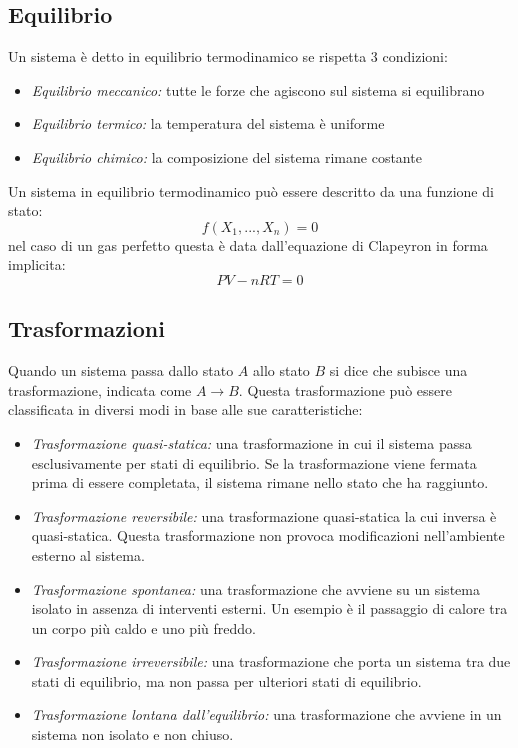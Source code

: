 \documentclass{article}
\begin{document}
\subsection{Equilibrio}
Un sistema è detto in equilibrio termodinamico se rispetta 3 condizioni:
\begin{itemize}
    \item \textit{Equilibrio meccanico:} tutte le forze che agiscono sul sistema si equilibrano
    \item \textit{Equilibrio termico:} la temperatura del sistema è uniforme
    \item \textit{Equilibrio chimico:} la composizione del sistema rimane costante
\end{itemize}
Un sistema in equilibrio termodinamico può essere descritto da una funzione di stato:
$$ f(X_1,...,X_n) = 0 $$
nel caso di un gas perfetto questa è data dall'equazione di Clapeyron in forma implicita:
$$ PV-nRT=0 $$


\subsection{Trasformazioni}
Quando un sistema passa dallo stato $A$ allo stato $B$ si dice che subisce una trasformazione, indicata come $A\rightarrow B$. Questa trasformazione può essere classificata in diversi modi in base alle sue caratteristiche:
\begin{itemize}
    \item \textit{Trasformazione quasi-statica:} una trasformazione in cui il sistema passa esclusivamente per stati di equilibrio. Se la trasformazione viene fermata prima di essere completata, il sistema rimane nello stato che ha raggiunto.
    \item \textit{Trasformazione reversibile:} una trasformazione quasi-statica la cui inversa è quasi-statica. Questa trasformazione non provoca modificazioni nell'ambiente esterno al sistema.
    \item \textit{Trasformazione spontanea:} una trasformazione che avviene su un sistema isolato in assenza di interventi esterni. Un esempio è il passaggio di calore tra un corpo più caldo e uno più freddo.
    \item \textit{Trasformazione irreversibile:} una trasformazione che porta un sistema tra due stati di equilibrio, ma non passa per ulteriori stati di equilibrio.
    \item \textit{Trasformazione lontana dall'equilibrio:} una trasformazione che avviene in un sistema non isolato e non chiuso.
\end{itemize}














\Index
\end{document}
